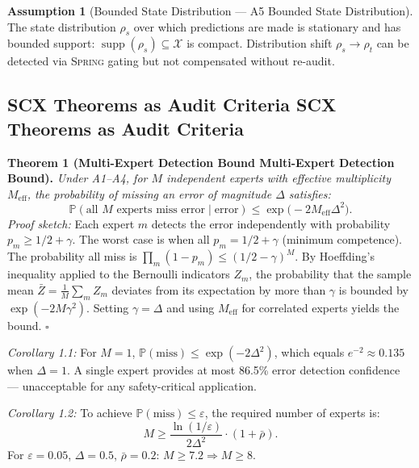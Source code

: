 \documentclass[12pt,a4paper]{article}
\theoremstyle{definition}
\newtheorem{assumption}[theorem]{Assumption}
\newcommand{\Spring}{\textsc{Spring}}
\DeclareMathOperator{\supp}{supp}
\newcommand{\Pbb}{\mathbb{P}}
\newcommand{\cX}{\mathcal{X}}
\begin{document}
\begin{assumption}[Bounded State Distribution — A5 Bounded State Distribution]
\label{asm:A5}
The state distribution $\rho_s$ over which predictions are made is stationary and has bounded support: $\supp(\rho_s) \subseteq \cX$ is compact. Distribution shift $\rho_s \to \rho_t$ can be detected via \Spring{} gating but not compensated without re-audit.
\end{assumption}

\subsection{SCX Theorems as Audit Criteria SCX Theorems as Audit Criteria}

\noindent\textbf{Theorem 1 (Multi-Expert Detection Bound Multi-Expert Detection Bound).} \textit{Under A1--A4, for $M$ independent experts with effective multiplicity $M_{\text{eff}}$, the probability of missing an error of magnitude $\Delta$ satisfies:}
\begin{equation}\label{eq:thm1}
    \Pbb(\text{all } M \text{ experts miss error} \mid \text{error}) \le \exp\bigl(-2 M_{\text{eff}} \Delta^2\bigr).
\end{equation}
\textit{Proof sketch:} Each expert $m$ detects the error independently with probability $p_m \ge 1/2 + \gamma$. The worst case is when all $p_m = 1/2 + \gamma$ (minimum competence). The probability all miss is $\prod_m (1 - p_m) \le (1/2 - \gamma)^M$. By Hoeffding's inequality applied to the Bernoulli indicators $Z_m$, the probability that the sample mean $\bar{Z} = \frac{1}{M}\sum_m Z_m$ deviates from its expectation by more than $\gamma$ is bounded by $\exp(-2M\gamma^2)$. Setting $\gamma = \Delta$ and using $M_{\text{eff}}$ for correlated experts yields the bound. \hfill $\square$

\textit{Corollary 1.1:} For $M=1$, $\Pbb(\text{miss}) \le \exp(-2\Delta^2)$, which equals $e^{-2} \approx 0.135$ when $\Delta = 1$. A single expert provides at most 86.5\% error detection confidence — unacceptable for any safety-critical application.

\textit{Corollary 1.2:} To achieve $\Pbb(\text{miss}) \le \varepsilon$, the required number of experts is:
\begin{equation}\label{eq:M_required}
    M \ge \frac{\ln(1/\varepsilon)}{2\Delta^2} \cdot (1 + \bar{\rho}).
\end{equation}
For $\varepsilon = 0.05$, $\Delta = 0.5$, $\bar{\rho} = 0.2$: $M \ge 7.2 \Rightarrow M \ge 8$.
\end{document}
